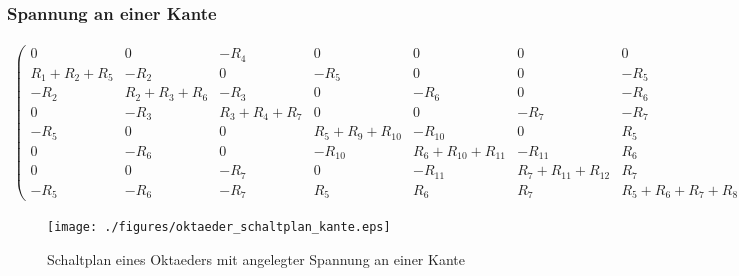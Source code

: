 \documentclass[10pt,a4paper]{article}
\begin{document}
\begin{landscape}
\subsubsection{Spannung an einer Kante}
\begin{align}
\begin{pmatrix}
	0 & 0 & -R_4 & 0 & 0 & 0 & 0 & R_4 \\
	R_1 + R_2 + R_5 & -R_2 & 0 & -R_5 & 0 & 0 &-R_5 & 0 \\
	-R_2 & R_2 + R_3 + R_6 & -R_3 & 0 & -R_6 & 0 & -R_6 & 0 \\
	0 & -R_3 & R_3 + R_4 + R_7 & 0 & 0 & -R_7 & -R_7 & -R_4 \\
	-R_5 & 0 & 0 & R_5 + R_9 + R_{10} & -R_{10} & 0 & R_5 & 0 \\
	0 & -R_6 & 0 & -R_{10} & R_6 + R_{10} + R_{11} & -R_{11} & R_6 & 0 \\
	0 & 0 & -R_7 & 0 & -R_{11} & R_7 + R_{11} + R_{12} & R_7 & 0 \\
	-R_5 & -R_6 & -R_7 & R_5 & R_6 & R_7 & R_5 + R_6 + R_7 + R_8 & 0
\end{pmatrix}
\begin{pmatrix}
I_1\\ I_2\\ I_3\\I_4\\I_5\\I_6\\I_7\\I_{ges}
\end{pmatrix}
=
\begin{pmatrix}
U\\0\\0\\0\\0\\0\\0\\0
\end{pmatrix}
\end{align}
\begin{figure}[htbp!]
\centering
\texttt{[image: ./figures/oktaeder\_schaltplan\_kante.eps]}
\caption{Schaltplan eines Oktaeders mit angelegter Spannung an einer Kante}
\label{fig:oktaeder_schaltplan_kante}
\end{figure}
\end{landscape}
\end{document}
